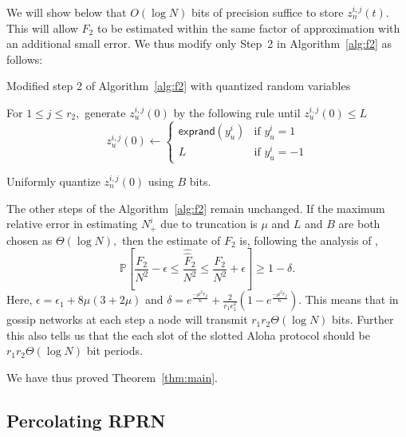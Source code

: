 \documentclass[10pt,twosided,a4paper,draft,onecolumn]{article}
\newcommand{\exprand}[1]{\mathsf{exprand}(#1)}
\newcommand{\prob}[1]{\mathbb{P}\left[ #1 \right]}
\begin{document}
We will show below that $O(\log N)$ bits of precision suffice to store
$z_n^{i,j}(t).$ This will allow $F_2$ to be estimated within the same
factor of approximation with an additional small error. We thus modify
only Step~2 in Algorithm~\ref{alg:f2} as follows:

\begin{algorithm}
  \caption{Modified step 2 of Algorithm~\ref{alg:f2} with quantized
    random variables}{\label{alg:quant}} 
  \begin{algorithmic}[2a] 
    \STATE For $1 \leq j \leq r_2,$ generate $z_u^{i,j}(0)$ by the
    following rule until $z_u^{i,j}(0) \leq L$ 
    \begin{equation*}
      z_u^{i,j}(0) \gets \begin{cases}
        \exprand{y_u^i} & \mbox{if } y_u^i =1 \\
        L & \mbox{if } y_u^i = -1
      \end{cases}
    \end{equation*}
  \item[] Uniformly quantize $z_n^{i,j}(0)$ using $B$ bits.
  \end{algorithmic}
\end{algorithm}
The other steps of the Algorithm~\ref{alg:f2} remain unchanged.  If
the maximum relative error in estimating $N_+^i$ due to truncation is
$\mu$ and $L$ and $B$ are both chosen as $\Theta(\log N),$ then the
estimate of $F_2$ is, following the analysis of \cite{Ayaso08},
\begin{displaymath}
  \prob{\frac{F_2}{N^2} - \epsilon \leq \frac{\hat{\hat{F}}_2}{N^2}
    \leq \frac{F_2}{N^2} + \epsilon} \geq 1-\delta.
\end{displaymath}
Here, $\epsilon = \epsilon_1 + 8\mu(3+2\mu)$ and $\delta =
e^{\frac{-\mu^2r_2}{6}} + \frac{2}{r_1 \epsilon_1^2}
(1-e^{\frac{-\mu^2r_2}{6}} ).$ This means that in gossip networks at each step a node will transmit $r_1r_2 \Theta(\log N)$ bits. 
Further this also tells us that the each slot
of the slotted Aloha protocol should be $r_1 r_2 \Theta(\log N)$ bit
periods.

We have thus proved Theorem~\ref{thm:main}. 

\subsection*{Percolating RPRN}
\end{document}
